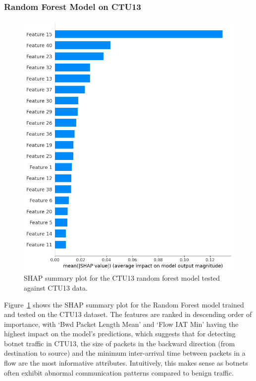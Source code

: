 \subsubsection{Random Forest Model on CTU13}\label{subsec:rf-ctu13}

\begin{figure}[H]
\centering
\includegraphics[width=\textwidth]{img/SHAP_RFCTU13_CTU13.png}
\caption{SHAP summary plot for the CTU13 random forest model tested against CTU13 data.}\label{fig:shap_rfc_ctu13_ctu13}
\end{figure}

Figure~\ref{fig:shap_rfc_ctu13_ctu13} shows the SHAP summary plot for the Random Forest model trained and tested on the CTU13 dataset. The features are ranked in descending order of importance, with `Bwd Packet Length Mean' and `Flow IAT Min' having the highest impact on the model's predictions, which suggests that for detecting botnet traffic in CTU13, the size of packets in the backward direction (from destination to source) and the minimum inter-arrival time between packets in a flow are the most informative attributes. Intuitively, this makes sense as botnets often exhibit abnormal communication patterns compared to benign traffic.

